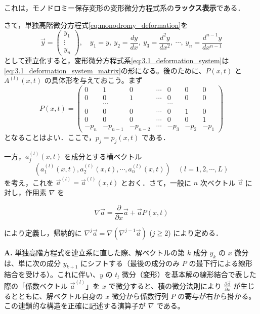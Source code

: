 これは，モノドロミー保存変形の変形微分方程式系の\textbf{ラックス表示}である．

さて，単独高階微分方程式\eqref{eq:monodromy_deformation}を
\[
  \vec{y} = \begin{pmatrix} y_1 \\ \vdots \\ y_n \end{pmatrix}, \quad
  y_1 = y, \ y_2 = \frac{dy}{dx}, \ y_3 = \frac{d^2 y}{dx^2}, \ \cdots, \ y_n = \frac{d^{n-1}y}{dx^{n-1}}
\]
として連立化すると，変形微分方程式系\eqref{eq:3.1_deformation_system}は\eqref{eq:3.1_deformation_system_matrix}の形になる。後のために、$P(x,t)$ と $A^{(l)}(x,t)$ の具体形を与えておこう。まず
\begin{equation}\label{eq:3.1_matrix_P}
  P(x,t) =
  \begin{pmatrix}
    0 & 1 & 0 & \cdots & 0 & 0 & 0 \\
    0 & 0 & 1 & \cdots & 0 & 0 & 0 \\
      & \cdots &   &        & \cdots &   &   \\
    0 & 0 & 0 & \cdots & 0 & 1 & 0 \\
    0 & 0 & 0 & \cdots & 0 & 0 & 1 \\
    -p_n & -p_{n-1} & -p_{n-2} & \cdots & -p_3 & -p_2 & -p_1
  \end{pmatrix}
\end{equation}
となることはよい．ここで，$p_j=p_j(x,t)$ である．

一方，$a_j^{(l)}(x,t)$ を成分とする横ベクトル
\[
  \left( a_1^{(l)}(x,t), a_2^{(l)}(x,t), \cdots, a_n^{(l)}(x,t) \right) \quad (l=1, 2, \cdots, L)
\]
を考え，これを $\vec{a}^{(l)} = \vec{a}^{(l)}(x,t)$ とおく．さて，一般に $n$ 次ベクトル $\vec{a}$ に対し，作用素 $\nabla$ を

\begin{equation}\label{eq:3.1_nabla}
  \nabla \vec{a} = \frac{\partial}{\partial x}\vec{a} + \vec{a}P(x,t)
\end{equation}

により定義し，帰納的に $\nabla^j \vec{a} = \nabla(\nabla^{j-1}\vec{a})$ ($j \geqq 2$) により定める．

\begin{Q}
\textbf{A.} 単独高階方程式を連立系に直した際、解ベクトルの第 $k$ 成分 $y_k$ の $x$ 微分は、単に次の成分 $y_{k+1}$ にシフトする（最後の成分のみ $P$ の最下行による線形結合を受ける）。これに伴い、$y$ の $t_l$ 微分（変形）を基本解の線形結合で表した際の「係数ベクトル $\vec{a}^{(l)}$」を $x$ で微分すると、積の微分法則により $\frac{\partial \vec{a}}{\partial x}$ が生じるとともに、解ベクトル自身の $x$ 微分から係数行列 $P$ の寄与が右から掛かる。この連鎖的な構造を正確に記述する演算子が $\nabla$ である。
\end{Q}

